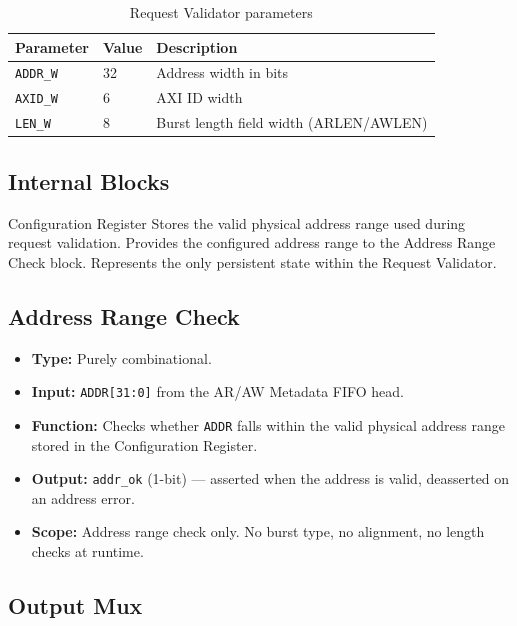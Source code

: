 \begin{table}[h!]
\centering
\begin{tabular}{lll}
\toprule
\textbf{Parameter} & \textbf{Value} & \textbf{Description} \\
\midrule
\texttt{ADDR\_W}  & 32 & Address width in bits \\
\texttt{AXID\_W}  & 6  & AXI ID width \\
\texttt{LEN\_W}   & 8  & Burst length field width (ARLEN/AWLEN) \\
\bottomrule
\end{tabular}
\caption{Request Validator parameters}
\end{table}

\subsection{Internal Blocks}

Configuration Register
Stores the valid physical address range used during request validation.
Provides the configured address range to the Address Range Check block.
Represents the only persistent state within the Request Validator.

\subsection{Address Range Check}

\begin{itemize}
  \item \textbf{Type:} Purely combinational.
  \item \textbf{Input:} \texttt{ADDR[31:0]} from the AR/AW Metadata
        FIFO head.
  \item \textbf{Function:} Checks whether \texttt{ADDR} falls within
        the valid physical address range stored in the Configuration Register.
  \item \textbf{Output:} \texttt{addr\_ok} (1-bit) — asserted when the
        address is valid, deasserted on an address error.
  \item \textbf{Scope:} Address range check only. No burst type, no
        alignment, no length checks at runtime.
\end{itemize}

\subsection{Output Mux}

